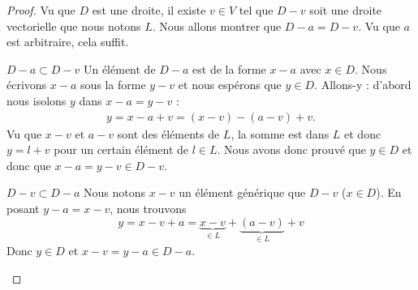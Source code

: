 \begin{proof}
    Vu que \( D\) est une droite, il existe \( v\in V\) tel que \( D-v\) soit une droite vectorielle que nous notons \( L\). Nous allons montrer que \( D-a=D-v\). Vu que \( a\) est arbitraire, cela suffit.

    \begin{subproof}
        \item[\( D-a\subset D-v\)]
            Un élément de \( D-a\) est de la forme \( x-a\) avec \( x\in D\). Nous écrivons \( x-a\) sous la forme \( y-v\) et nous espérons que \( y\in D\). Allons-y : d'abord nous isolons \( y\) dans \( x-a=y-v\) :
            \begin{subequations}
                \begin{align}
                    y=x-a+v=(x-v)-(a-v)+v.
                \end{align}
            \end{subequations}
            Vu que \( x-v\) et \( a-v\) sont des éléments de \( L\), la somme est dans \( L\) et donc \( y=l+v\) pour un certain élément de \( l\in L\). Nous avons donc prouvé que \( y\in D\) et donc que \( x-a=y-v\in D-v\).
        \item[\( D-v\subset D-a\)]
            Nous notons \( x-v\) un élément générique que \( D-v\) (\( x\in D\)). En posant \( y-a=x-v\), nous trouvons
            \begin{equation}
                y=x-v+a=\underbrace{x-v}_{\in L}+\underbrace{(a-v)}_{\in L}+v
            \end{equation}
            Donc \( y\in D\) et \( x-v=y-a\in D-a\).
    \end{subproof}
\end{proof}

